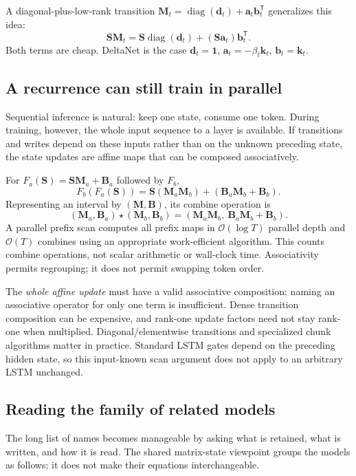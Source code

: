 \documentclass[11pt, oneside]{book}
\newcommand{\T}{^{\mathsf{T}}}           %
\newcommand{\diag}{\operatorname{diag}}
\newcommand{\bigO}[1]{\mathcal{O}\!\left(#1\right)}
\let\originalsubsection\subsection
\renewcommand{\subsection}{\Needspace{6\baselineskip}\originalsubsection}
\begin{document}
A diagonal-plus-low-rank transition $\mathbf{M}_t=\diag(\mathbf{d}_t)+\mathbf{a}_t\mathbf{b}_t\T$ generalizes this idea:
\[
 \mathbf{S}\mathbf{M}_t=\mathbf{S}\diag(\mathbf{d}_t)
 +(\mathbf{S}\mathbf{a}_t)\mathbf{b}_t\T.
\]
Both terms are cheap. DeltaNet is the case $\mathbf{d}_t=\mathbf{1}$, $\mathbf{a}_t=-\beta_t\mathbf{k}_t$, $\mathbf{b}_t=\mathbf{k}_t$.

\subsection*{A recurrence can still train in parallel}
Sequential inference is natural: keep one state, consume one token. During training, however, the whole input sequence to a layer is available. If transitions and writes depend on these inputs rather than on the unknown preceding state, the state updates are affine maps that can be composed associatively.

For $F_a(\mathbf{S})=\mathbf{S}\mathbf{M}_a+\mathbf{B}_a$ followed by $F_b$,
\[
 F_b(F_a(\mathbf{S}))=
 \mathbf{S}(\mathbf{M}_a\mathbf{M}_b)
 +(\mathbf{B}_a\mathbf{M}_b+\mathbf{B}_b).
\]
Representing an interval by $(\mathbf{M},\mathbf{B})$, its combine operation is
\[
 (\mathbf{M}_a,\mathbf{B}_a)\star(\mathbf{M}_b,\mathbf{B}_b)
 =(\mathbf{M}_a\mathbf{M}_b,\ \mathbf{B}_a\mathbf{M}_b+\mathbf{B}_b).
\]
A parallel prefix scan computes all prefix maps in $\bigO{\log T}$ parallel depth and $\bigO{T}$ combines using an appropriate work-efficient algorithm. This counts combine operations, not scalar arithmetic or wall-clock time. Associativity permits regrouping; it does not permit swapping token order.

\begin{notebox}[title={Associative does not automatically mean cheap}]
The \emph{whole affine update} must have a valid associative composition; naming an associative operator for only one term is insufficient. Dense transition composition can be expensive, and rank-one update factors need not stay rank-one when multiplied. Diagonal/elementwise transitions and specialized chunk algorithms matter in practice. Standard LSTM gates depend on the preceding hidden state, so this input-known scan argument does not apply to an arbitrary LSTM unchanged.
\end{notebox}

\subsection*{Reading the family of related models}
The long list of names becomes manageable by asking what is retained, what is written, and how it is read. The shared matrix-state viewpoint groups the models as follows; it does not make their equations interchangeable.
\end{document}
